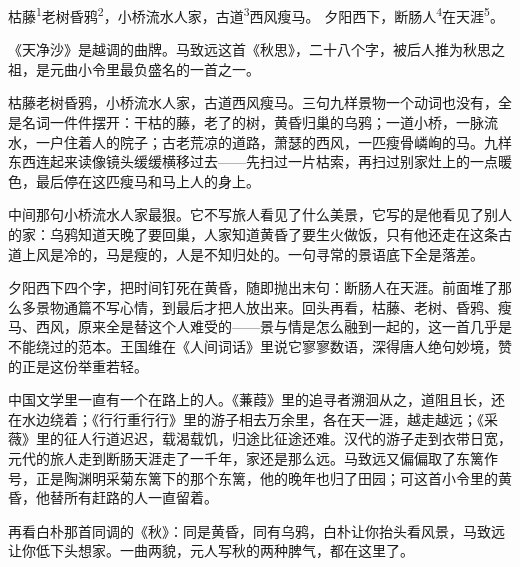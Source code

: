 
\begin{poem}
枯藤\textsuperscript{1}老树昏鸦\textsuperscript{2}，小桥流水人家，古道\textsuperscript{3}西风瘦马。
夕阳西下，断肠人\textsuperscript{4}在天涯\textsuperscript{5}。
\end{poem}

\begin{annotations}
\end{annotations}

\begin{appreciation}
《天净沙》是越调的曲牌。马致远这首《秋思》，二十八个字，被后人推为秋思之祖，是元曲小令里最负盛名的一首之一。

枯藤老树昏鸦，小桥流水人家，古道西风瘦马。三句九样景物一个动词也没有，全是名词一件件摆开：干枯的藤，老了的树，黄昏归巢的乌鸦；一道小桥，一脉流水，一户住着人的院子；古老荒凉的道路，萧瑟的西风，一匹瘦骨嶙峋的马。九样东西连起来读像镜头缓缓横移过去——先扫过一片枯索，再扫过别家灶上的一点暖色，最后停在这匹瘦马和马上人的身上。

中间那句小桥流水人家最狠。它不写旅人看见了什么美景，它写的是他看见了别人的家：乌鸦知道天晚了要回巢，人家知道黄昏了要生火做饭，只有他还走在这条古道上风是冷的，马是瘦的，人是不知归处的。一句寻常的景语底下全是落差。

夕阳西下四个字，把时间钉死在黄昏，随即抛出末句：断肠人在天涯。前面堆了那么多景物通篇不写心情，到最后才把人放出来。回头再看，枯藤、老树、昏鸦、瘦马、西风，原来全是替这个人难受的——景与情是怎么融到一起的，这一首几乎是不能绕过的范本。王国维在《人间词话》里说它寥寥数语，深得唐人绝句妙境，赞的正是这份举重若轻。

中国文学里一直有一个在路上的人。《蒹葭》里的追寻者溯洄从之，道阻且长，还在水边绕着；《行行重行行》里的游子相去万余里，各在天一涯，越走越远；《采薇》里的征人行道迟迟，载渴载饥，归途比征途还难。汉代的游子走到衣带日宽，元代的旅人走到断肠天涯走了一千年，家还是那么远。马致远又偏偏取了东篱作号，正是陶渊明采菊东篱下的那个东篱，他的晚年也归了田园；可这首小令里的黄昏，他替所有赶路的人一直留着。

再看白朴那首同调的《秋》：同是黄昏，同有乌鸦，白朴让你抬头看风景，马致远让你低下头想家。一曲两貌，元人写秋的两种脾气，都在这里了。
\end{appreciation}

